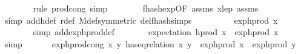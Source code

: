 \begin{isabellebody}
\ \ \ \ \ \ \isamarkupfalse%
\ {\isacharparenleft}{\kern0pt}rule\ prod{\isachardot}{\kern0pt}cong{\isacharcomma}{\kern0pt}\ simp{\isacharparenright}{\kern0pt}\isanewline
\ \ \ \ \ \ \isamarkupfalse%
\ f{}{\isacharunderscore}{\kern0pt}hash{\isacharunderscore}{\kern0pt}exp{\isacharbrackleft}{\kern0pt}OF\ assms{\isacharparenleft}{\kern0pt}{}{\isacharparenright}{\kern0pt}\ x{\isacharunderscore}{\kern0pt}le{\isacharunderscore}{\kern0pt}p\ assms{\isacharparenleft}{\kern0pt}{}{\isacharparenright}{\kern0pt}{\isacharbrackright}{\kern0pt}\ \isanewline
\ \ \ \ \ \ \isamarkupfalse%
\ {\isacharparenleft}{\kern0pt}simp\ add{\isacharcolon}{\kern0pt}h{\isacharunderscore}{\kern0pt}def\ r{\isacharunderscore}{\kern0pt}def\ M{\isacharunderscore}{\kern0pt}def{\isacharbrackleft}{\kern0pt}symmetric{\isacharbrackright}{\kern0pt}\ del{\isacharcolon}{\kern0pt}f{}{\isacharunderscore}{\kern0pt}hash{\isachardot}{\kern0pt}simps{\isacharparenright}{\kern0pt}\isanewline
\ \ \ \ \isamarkupfalse%
\ \isamarkupfalse%
\ {\isachardoublequoteopen}{\isachardot}{\kern0pt}{\isachardot}{\kern0pt}{\isachardot}{\kern0pt}\ {\isacharequal}{\kern0pt}\ exp{\isacharunderscore}{\kern0pt}h{\isacharunderscore}{\kern0pt}prod\ x{\isachardoublequoteclose}\isanewline
\ \ \ \ \ \ \isamarkupfalse%
\ {\isacharparenleft}{\kern0pt}simp\ add{\isacharcolon}{\kern0pt}exp{\isacharunderscore}{\kern0pt}h{\isacharunderscore}{\kern0pt}prod{\isacharunderscore}{\kern0pt}def{\isacharparenright}{\kern0pt}\isanewline
\ \ \ \ \isamarkupfalse%
\ \isamarkupfalse%
\ {\isachardoublequoteopen}expectation\ {\isacharparenleft}{\kern0pt}h{\isacharunderscore}{\kern0pt}prod\ x{\isacharparenright}{\kern0pt}\ {\isacharequal}{\kern0pt}\ exp{\isacharunderscore}{\kern0pt}h{\isacharunderscore}{\kern0pt}prod\ x{\isachardoublequoteclose}\ \isamarkupfalse%
\ simp\isanewline
\ \ \isamarkupfalse%
\isanewline
\isanewline
\ \ \isamarkupfalse%
\ exp{\isacharunderscore}{\kern0pt}h{\isacharunderscore}{\kern0pt}prod{\isacharunderscore}{\kern0pt}cong{\isacharcolon}{\kern0pt}\ {\isachardoublequoteopen}{\isasymAnd}x\ y{\isachardot}{\kern0pt}\ has{\isacharunderscore}{\kern0pt}eq{\isacharunderscore}{\kern0pt}relation\ x\ y\ {\isasymLongrightarrow}\ exp{\isacharunderscore}{\kern0pt}h{\isacharunderscore}{\kern0pt}prod\ x\ {\isacharequal}{\kern0pt}\ exp{\isacharunderscore}{\kern0pt}h{\isacharunderscore}{\kern0pt}prod\ y{\isachardoublequoteclose}\ \isanewline

\end{isabellebody}
